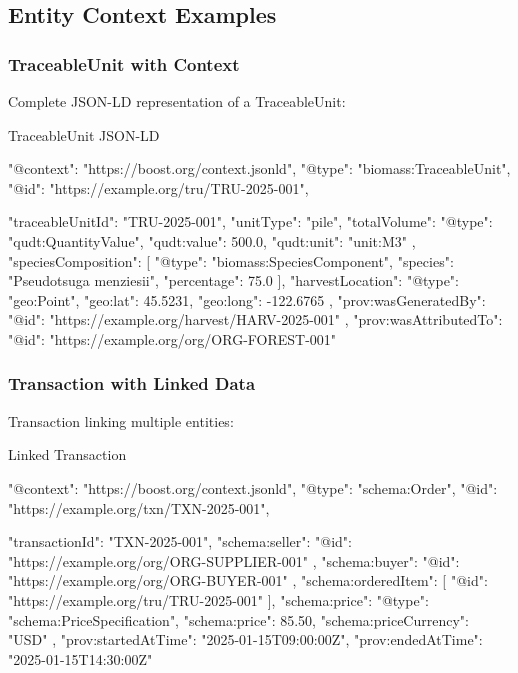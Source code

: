 \subsection{Entity Context Examples}
\label{sec:entity-context-examples}

\subsubsection{TraceableUnit with Context}

Complete JSON-LD representation of a TraceableUnit:

\begin{jsonexample}{TraceableUnit JSON-LD}
{
  "@context": "https://boost.org/context.jsonld",
  "@type": "biomass:TraceableUnit",
  "@id": "https://example.org/tru/TRU-2025-001",
  
  "traceableUnitId": "TRU-2025-001",
  "unitType": "pile",
  "totalVolume": {
    "@type": "qudt:QuantityValue",
    "qudt:value": 500.0,
    "qudt:unit": "unit:M3"
  },
  "speciesComposition": [{
    "@type": "biomass:SpeciesComponent",
    "species": "Pseudotsuga menziesii",
    "percentage": 75.0
  }],
  "harvestLocation": {
    "@type": "geo:Point",
    "geo:lat": 45.5231,
    "geo:long": -122.6765
  },
  "prov:wasGeneratedBy": {
    "@id": "https://example.org/harvest/HARV-2025-001"
  },
  "prov:wasAttributedTo": {
    "@id": "https://example.org/org/ORG-FOREST-001"
  }
}
\end{jsonexample}

\subsubsection{Transaction with Linked Data}

Transaction linking multiple entities:

\begin{jsonexample}{Linked Transaction}
{
  "@context": "https://boost.org/context.jsonld",
  "@type": "schema:Order",
  "@id": "https://example.org/txn/TXN-2025-001",
  
  "transactionId": "TXN-2025-001",
  "schema:seller": {
    "@id": "https://example.org/org/ORG-SUPPLIER-001"
  },
  "schema:buyer": {
    "@id": "https://example.org/org/ORG-BUYER-001"
  },
  "schema:orderedItem": [{
    "@id": "https://example.org/tru/TRU-2025-001"
  }],
  "schema:price": {
    "@type": "schema:PriceSpecification",
    "schema:price": 85.50,
    "schema:priceCurrency": "USD"
  },
  "prov:startedAtTime": "2025-01-15T09:00:00Z",
  "prov:endedAtTime": "2025-01-15T14:30:00Z"
}
\end{jsonexample}

